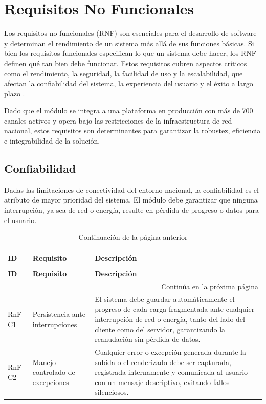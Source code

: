 \section{Requisitos No Funcionales}

Los requisitos no funcionales (RNF) son esenciales para el desarrollo de software y determinan el
rendimiento de un sistema más allá de sus funciones básicas. Si bien los requisitos funcionales
especifican lo que un sistema debe hacer, los RNF definen qué tan bien debe
funcionar. Estos requisitos cubren aspectos críticos como el rendimiento, la seguridad, la facilidad
de uso y la escalabilidad, que afectan la confiabilidad del sistema, la experiencia del usuario y el
éxito a largo plazo \citep{Wiegers2013}.

Dado que el módulo se integra a una plataforma en producción con más de 700 canales activos y opera
bajo las restricciones de la infraestructura de red nacional, estos requisitos son determinantes para
garantizar la robustez, eficiencia e integrabilidad de la solución.

\subsection{Confiabilidad}

Dadas las limitaciones de conectividad del entorno nacional, la confiabilidad es el atributo de mayor
prioridad del sistema. El módulo debe garantizar que ninguna interrupción, ya sea de red o energía,
resulte en pérdida de progreso o datos para el usuario.

\begin{longtable}[c]{|p{1.8cm}|p{3cm}|p{8cm}|}
\caption{Requisitos de Confiabilidad}
\label{tb:rnf_confiabilidad}\\
\hline
\multicolumn{3}{|l|}{{\textbf{Confiabilidad}}} \\
\hline
\textbf{ID} & \textbf{Requisito} & \textbf{Descripción} \\
\hline
\endfirsthead
\caption[]{Continuación de la página anterior} \\
\hline
\textbf{ID} & \textbf{Requisito} & \textbf{Descripción} \\
\hline
\endhead
\multicolumn{3}{r}{{Continúa en la próxima página}} \\
\endfoot
\hline
\endlastfoot

RnF-C1 & Persistencia ante interrupciones &
El sistema debe guardar automáticamente el progreso de cada carga fragmentada ante cualquier
interrupción de red o energía, tanto del lado del cliente como del servidor, garantizando la
reanudación sin pérdida de datos. \\ \hline

RnF-C2 & Manejo controlado de excepciones &
Cualquier error o excepción generada durante la subida o el renderizado debe ser capturada, registrada
internamente y comunicada al usuario con un mensaje descriptivo, evitando fallos silenciosos. \\ \hline

\end{longtable}

